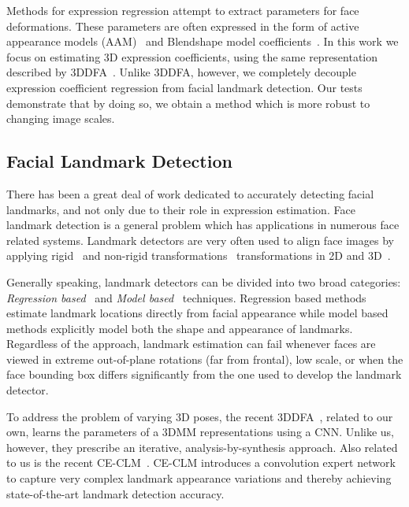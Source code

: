 \documentclass[a4paper, 10pt, conference]{ieeeconf}
\begin{document}
Methods for expression regression attempt to extract parameters for face deformations. These parameters are often expressed in the form of active appearance models (AAM)~\cite{lucey2010extended} and Blendshape model coefficients~\cite{richardson2016learning,zhu2015,zhu2015high}. In this work we focus on estimating 3D expression coefficients, using the same representation described by 3DDFA~\cite{zhu2015}. Unlike 3DDFA, however, we completely decouple expression coefficient regression from facial landmark detection. Our tests demonstrate that by doing so, we obtain a method which is more robust to changing image scales. 



\subsection{Facial Landmark Detection} There has been a great deal of work dedicated to accurately detecting facial landmarks, and not only due to their role in expression estimation. Face landmark detection is a general problem which has applications in numerous face related systems. Landmark detectors are very often used to align face images by applying rigid~\cite{eidinger2013age,Everingham06a,wolf:YTF} and non-rigid transformations~\cite{hassner2013viewing,jeni2015dense,zhu2015} transformations in 2D and 3D~\cite{hassner2015effective,Masi:18:learning,masi2014pose,masi2017rapid,masi16dowe}. 

Generally speaking, landmark detectors can be divided into two broad categories: {\em Regression based}~\cite{burgos2013robust,king2009dlib,wu2017facial} and {\em Model based}~\cite{baltruvsaitis2016openface,zadeh2016deep,zhu2015} techniques. Regression based methods estimate landmark locations directly from facial appearance while model based methods explicitly model both the shape and appearance of landmarks. Regardless of the approach, landmark estimation can fail whenever faces are viewed in extreme out-of-plane rotations (far from frontal), low scale, or when the face bounding box differs significantly from the one used to develop the landmark detector. 


To address the problem of varying 3D poses, the recent 3DDFA~\cite{zhu2015}, related to our own, learns the parameters of a 3DMM representations using a CNN. Unlike us, however, they prescribe an iterative, analysis-by-synthesis approach. Also related to us is the recent CE-CLM~\cite{zadeh2016deep}. CE-CLM introduces a convolution expert network to capture very complex landmark appearance variations and thereby achieving state-of-the-art landmark detection accuracy.
\end{document}
